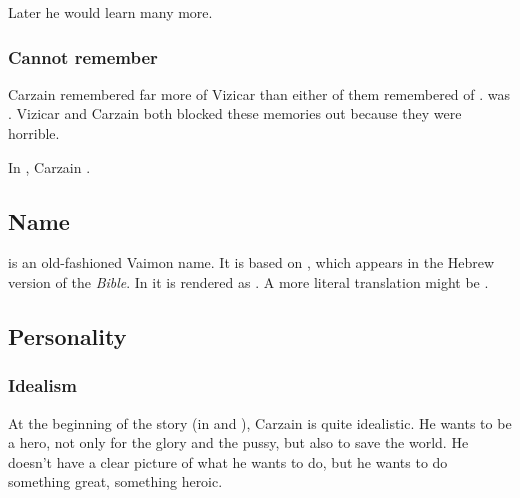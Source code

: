 Later he would learn many more. 





\subsubsection{Cannot remember \Tydesmos}
Carzain remembered far more of Vizicar than either of them remembered of \Tydesmos. 
\Tydesmos was .
Vizicar and Carzain both blocked these memories out because they were horrible. 

In \emph{\CarzainWithRedcorBook{}}, Carzain . 









\subsection{Name}
\quo{\Shireyo} is an old-fashioned Vaimon name. 
It is based on , which appears in the Hebrew version of the \emph{Bible}. 
In \cite[Isaiah 14:12]{KingJamesBible} it is rendered as . 
A more literal translation might be .









\subsection{Personality}





\subsubsection{Idealism}
At the beginning of the story (in \emph{\TwilightAngelRemember{}} and \emph{\CarzainWithRedcorBook{}}), Carzain is quite idealistic. He wants to be a hero, not only for the glory and the pussy, but also to save the world. He doesn't have a clear picture of what he wants to do, but he wants to do something great, something heroic. 

